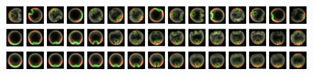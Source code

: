 \documentclass[12pt]{minimal}
\begin{document}
\centering
{}
\includegraphics[width=17cm]{fixed_images_unregistered_unordered_subsampled}\\
\vspace{0.2cm}
\includegraphics[width=17cm]{fixed_images_registered_ordered_subsampled}\\
\vspace{0.2cm}
\includegraphics[width=17cm]{fixed_images_average_trajectory}
\end{document}
